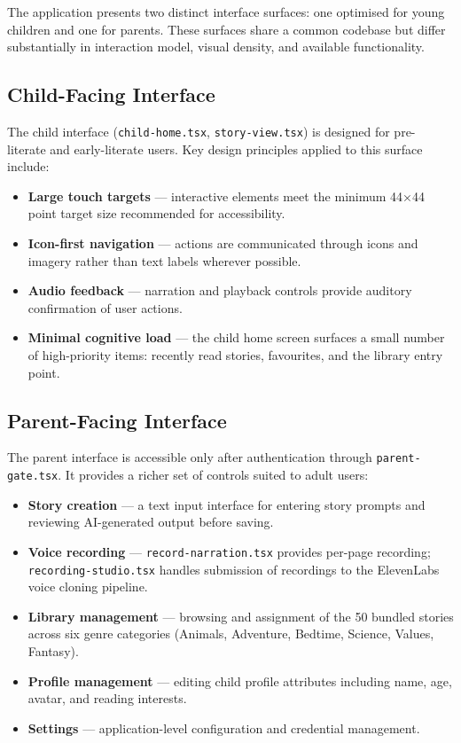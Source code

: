 The application presents two distinct interface surfaces: one optimised for young children and one for parents. These surfaces share a common codebase but differ substantially in interaction model, visual density, and available functionality.

\subsection*{Child-Facing Interface}

The child interface (\texttt{child-home.tsx}, \texttt{story-view.tsx}) is designed for pre-literate and early-literate users. Key design principles applied to this surface include:

\begin{itemize}
    \item \textbf{Large touch targets} — interactive elements meet the minimum 44×44 point target size recommended for accessibility.
    \item \textbf{Icon-first navigation} — actions are communicated through icons and imagery rather than text labels wherever possible.
    \item \textbf{Audio feedback} — narration and playback controls provide auditory confirmation of user actions.
    \item \textbf{Minimal cognitive load} — the child home screen surfaces a small number of high-priority items: recently read stories, favourites, and the library entry point.
\end{itemize}

\subsection*{Parent-Facing Interface}

The parent interface is accessible only after authentication through \texttt{parent-gate.tsx}. It provides a richer set of controls suited to adult users:

\begin{itemize}
    \item \textbf{Story creation} — a text input interface for entering story prompts and reviewing AI-generated output before saving.
    \item \textbf{Voice recording} — \texttt{record-narration.tsx} provides per-page recording; \texttt{recording-studio.tsx} handles submission of recordings to the ElevenLabs voice cloning pipeline.
    \item \textbf{Library management} — browsing and assignment of the 50 bundled stories across six genre categories (Animals, Adventure, Bedtime, Science, Values, Fantasy).
    \item \textbf{Profile management} — editing child profile attributes including name, age, avatar, and reading interests.
    \item \textbf{Settings} — application-level configuration and credential management.
\end{itemize}

